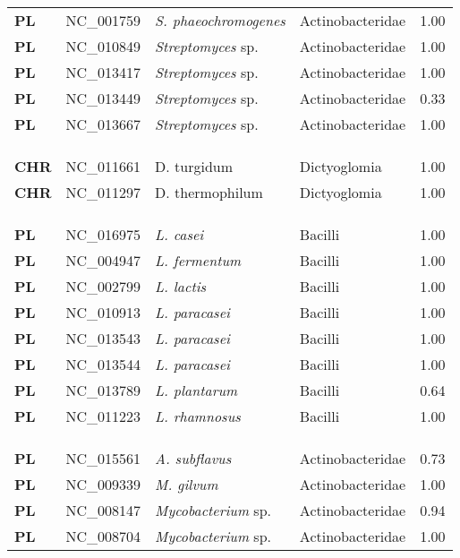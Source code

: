 \begin{adjustwidth}{-3cm}{2cm}
{\begin{supertabular}{>{\bfseries}l|p{0.1\textwidth}p{0.14\textwidth}l|l}
PL & NC\_001759 & \textit{S. phaeochromogenes} & Actinobacteridae & 1.00\\
PL & NC\_010849 & \textit{Streptomyces} sp. & Actinobacteridae & 1.00\\
PL & NC\_013417 & \textit{Streptomyces} sp. & Actinobacteridae & 1.00\\
PL & NC\_013449 & \textit{Streptomyces} sp. & Actinobacteridae & 0.33\\
PL & NC\_013667 & \textit{Streptomyces} sp. & Actinobacteridae & 1.00\\
\\
\\
\hline\\
CHR & NC\_011661 & D. turgidum & Dictyoglomia & 1.00\\
CHR & NC\_011297 & D. thermophilum & Dictyoglomia & 1.00\\
\\
\\
\hline\\
PL & NC\_016975 & \textit{L. casei} & Bacilli & 1.00\\
PL & NC\_004947 & \textit{L. fermentum} & Bacilli & 1.00\\
PL & NC\_002799 & \textit{L. lactis} & Bacilli & 1.00\\
PL & NC\_010913 & \textit{L. paracasei} & Bacilli & 1.00\\
PL & NC\_013543 & \textit{L. paracasei} & Bacilli & 1.00\\
PL & NC\_013544 & \textit{L. paracasei} & Bacilli & 1.00\\
PL & NC\_013789 & \textit{L. plantarum} & Bacilli & 0.64\\
PL & NC\_011223 & \textit{L. rhamnosus} & Bacilli & 1.00\\
\\
\\
\hline\\
PL & NC\_015561 & \textit{A. subflavus} & Actinobacteridae & 0.73\\
PL & NC\_009339 & \textit{M. gilvum} & Actinobacteridae & 1.00\\
PL & NC\_008147 & \textit{Mycobacterium} sp. & Actinobacteridae & 0.94\\
PL & NC\_008704 & \textit{Mycobacterium} sp. & Actinobacteridae & 1.00\\

\end{supertabular}}
\end{adjustwidth}
